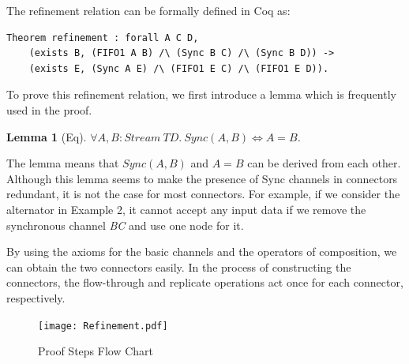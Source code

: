 \documentclass[preprint,3p]{elsarticle}
\newtheorem{theorem}{Theorem}[section]
\newtheorem{lemma}{Lemma}[section]
\begin{document}
The refinement relation can be formally defined in Coq as:



\begin{lstlisting}[language=coq]
Theorem refinement : forall A C D,
    (exists B, (FIFO1 A B) /\ (Sync B C) /\ (Sync B D)) ->
    (exists E, (Sync A E) /\ (FIFO1 E C) /\ (FIFO1 E D)).
\end{lstlisting}



To prove this refinement relation, we first introduce a lemma which is frequently used in the proof.
\begin{lemma}[Eq]\label{lemma:eq}
$\forall A,B: Stream~TD.\:Sync (A,B) \Leftrightarrow A = B$.
\end{lemma}
The lemma means that $Sync(A, B)$ and $A=B$ can be derived
from each other. Although this lemma seems to make the presence of
Sync channels in connectors redundant, it is not the case for most
connectors. For example, if we consider
the alternator in Example 2, it cannot accept any input data if we
remove the synchronous channel \emph{BC} and use one node for it.

By using the axioms for the basic channels and the operators of composition, we can obtain the two connectors easily.
In the process of constructing the connectors, the flow-through and replicate operations act once for each connector, respectively.


\begin{figure}[htbp]
\centering
\texttt{[image: Refinement.pdf]}
\caption{Proof Steps Flow Chart}
\label{fig:equivalence}
\end{figure}
\end{document}
